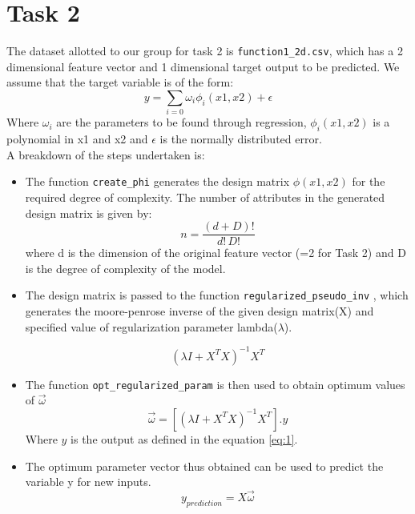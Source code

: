 \documentclass[12pt,a4paper]{article}
\def\tt#1{\texttt{#1}}
\begin{document}
\section{Task 2}

The dataset allotted to our group for task 2 is \tt{function1\_2d.csv}, which has a 2 dimensional feature vector and 1 dimensional target output to be predicted. We assume that the target variable is of the form:
\begin{equation}\label{eq:1}
    y=\sum_{i=0}\omega _{i}\phi_{i}(x1,x2)  +\epsilon 
\end{equation}
Where $\omega_{i}$ are the parameters to be found through regression, $\phi_{i}(x1,x2)$ is a polynomial in x1 and x2 and $\epsilon$ is the normally distributed error. 
\\ A breakdown of the steps undertaken is:

\begin{itemize}
    \item The function \tt{create\_phi} generates the design matrix $\phi(x1,x2)$ for the required degree of complexity.
    The number of attributes in the generated design matrix is given by:
    \begin{equation}
        n=\frac{(d+D)!}{d!\,D!}
    \end{equation}
    where d is the dimension of the original feature vector (=2 for Task 2) and D is the degree of complexity of the model. 
    \item The design matrix is passed to the function \tt{regularized\_pseudo\_inv} , which generates the moore-penrose inverse of the given design matrix(X) and specified value of regularization parameter lambda($\lambda$).
    
    \begin{equation}
         (\lambda I+X^{T}X)^{-1}X^{T}
    \end{equation}
    
    \item The function \tt{opt\_regularized\_param} is then used to obtain optimum values of $\vec{\omega}$
    \begin{equation}
        \vec{\omega} = [(\lambda I+X^{T}X)^{-1}X^{T}].y
    \end{equation}
    Where $y$ is the output as defined in the equation \ref{eq:1}.
    
    \item The optimum parameter vector thus obtained can be used to predict the variable y for new inputs. 
    \begin{equation}
        y_{prediction}=X\vec{\omega}
    \end{equation}
\end{itemize}
\end{document}

